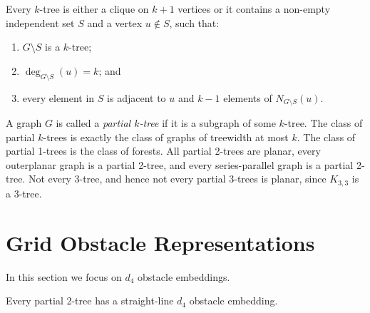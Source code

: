 \documentclass{patmorin}
\begin{document}
\begin{lem}
   Every $k$-tree is either a clique on $k+1$ vertices or it contains a non-empty independent set $S$ and a vertex $u\not\in S$, such that:
\begin{enumerate}
   \item $G\setminus S$ is a $k$-tree;
   \item $\deg_{G\setminus S}(u)=k$; and 
   \item every element in $S$ is adjacent to $u$ and $k-1$ elements of
   $N_{G\setminus S}(u)$.
\end{enumerate}
\end{lem}

A graph $G$ is called a \emph{partial $k$-tree} if it is a subgraph of
some $k$-tree.  The class of partial $k$-trees is exactly the class of
graphs of treewidth at most $k$.  The class of partial 1-trees is the
class of forests.  All partial 2-trees are planar, every outerplanar graph
is a partial 2-tree, and every series-parallel graph is a partial 2-tree.
Not every 3-tree, and hence not every partial 3-trees is planar, since
$K_{3,3}$ is a 3-tree.

\section{Grid Obstacle Representations}

In this section we focus on $d_4$ obstacle embeddings.

\begin{thm}
  Every partial 2-tree has a straight-line $d_4$ obstacle embedding.
\end{thm}
\end{document}
